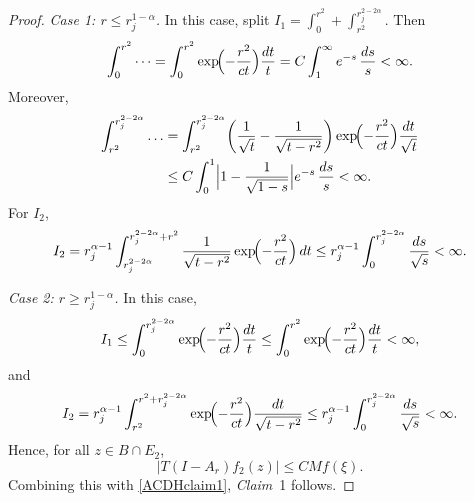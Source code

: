 \documentclass[12pt]{amsart}
\begin{document}
\begin{proof}
\textit{Case 1: $r\le r_j^{1-\alpha}$.} In this case, split $I_1 = \int_0^{r^2}+\int_{r^2}^{r_j^{2-2\alpha}}$. Then
\begin{equation*}
    \int_0^{r^2} \dots = \int_0^{r^2} \exp\!\Bigl( - \frac{r^2}{c t} \Bigr) \frac{dt}{t} = C \int_1^\infty e^{-s} \, \frac{ds}{s}<\infty.
\end{equation*}
Moreover,
\begin{align*}
    \int_{r^{2}}^{r_j^{2-2\alpha}} \dots
    &= \int_{r^{2}}^{r_j^{2-2\alpha}} \biggl( \frac{1}{\sqrt{t}} - \frac{1}{\sqrt{t-r^2}} \biggr) \exp\!\Bigl( - \frac{r^2}{c t} \Bigr) \frac{dt}{\sqrt{t}}\\
    &\le C\int_0^1 \Bigl| 1- \frac{1}{\sqrt{1-s}} \Bigr| e^{-s} \, \frac{ds}{s} < \infty.
\end{align*}
For $I_2$,
\begin{align*}
    I_2
    = r_j^{\alpha-1}\int_{r_j^{2-2\alpha}}^{r_j^{2-2\alpha}+r^2} \frac{1}{\sqrt{t-r^2}} \exp\!\Bigl( - \frac{r^2}{c t} \Bigr) \, dt
    \le r_j^{\alpha-1} \int_{0}^{r_j^{2-2\alpha}} \frac{ds}{\sqrt{s}}<\infty.
\end{align*}

\textit{Case 2: $r\ge r_j^{1-\alpha}$.} In this case,
\begin{align*}
    I_1 \le \int_0^{r_j^{2-2\alpha}} \exp\!\Bigl( - \frac{r^2}{c t} \Bigr) \frac{dt}{t}
    \le \int_0^{r^2} \exp\!\Bigl( - \frac{r^2}{c t} \Bigr) \frac{dt}{t}<\infty,
\end{align*}
and
\begin{align*}
    I_2
    = r_j^{\alpha-1} \int_{r^2}^{r^2+r_j^{2-2\alpha}} \exp\!\Bigl( - \frac{r^2}{c t} \Bigr)\frac{dt}{\sqrt{t-r^2}}
    \le r_j^{\alpha-1} \int_{0}^{r_j^{2-2\alpha}} \frac{ds}{\sqrt{s}}<\infty.
\end{align*}
Hence, for all $z\in B\cap E_2$,
\begin{equation*}
    |T(I-A_r)f_2(z)| \le C Mf(\xi).
\end{equation*}
Combining this with \eqref{ACDHclaim1}, \textit{Claim}~1 follows.


\end{proof}
\end{document}
